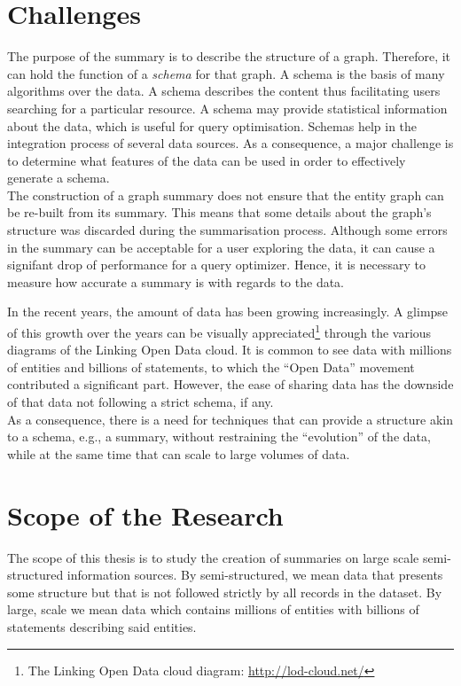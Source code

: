 \section{Challenges}

The purpose of the summary is to describe the structure of a graph. Therefore, it can hold the function of a \emph{schema} for that graph.
A schema is the basis of many algorithms over the data. A schema describes the content thus facilitating users searching for a particular resource. A schema may provide statistical information about the data, which is useful for query optimisation. Schemas help in the integration process of several data sources. As a consequence, a major challenge is to determine what features of the data can be used in order to effectively generate a schema.\\

The construction of a graph summary does not ensure that the entity graph can be re-built from its summary. This means that some details about the graph's structure was discarded during the summarisation process. Although some errors in the summary can be acceptable for a user exploring the data, it can cause a signifant drop of performance for a query optimizer. Hence, it is necessary to measure how accurate a summary is with regards to the data.

In the recent years, the amount of data has been growing increasingly. A glimpse of this growth over the years can be visually appreciated\footnote{The Linking Open Data cloud diagram: \url{http://lod-cloud.net/}} through the various diagrams of the Linking Open Data cloud. It is common to see data with millions of entities and billions of statements, to which the ``Open Data'' movement contributed a significant part. However, the ease of sharing data has the downside of that data not following a strict schema, if any.\\

As a consequence, there is a need for techniques that can provide a structure akin to a schema, e.g., a summary, without restraining the ``evolution'' of the data, while at the same time that can scale to large volumes of data.

\section{Scope of the Research}

The scope of this thesis is to study the creation of summaries on large scale semi-structured information sources. By semi-structured, we mean data that presents some structure but that is not followed strictly by all records in the dataset. By large, scale we mean data which contains millions of entities with billions of statements describing said entities.

